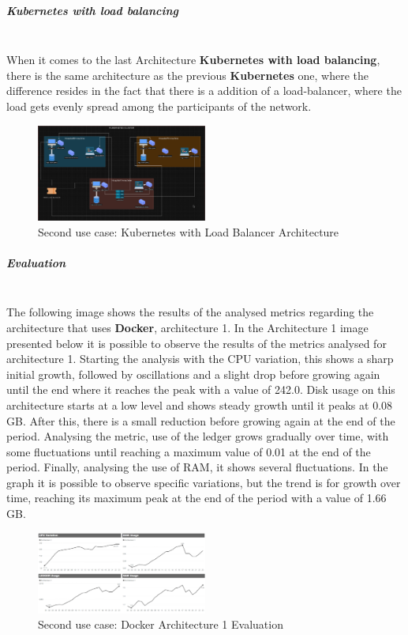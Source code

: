 \subparagraph{Kubernetes with load balancing} \mbox{}\\
When it comes to the last Architecture \textbf{Kubernetes with load balancing}, there is the same architecture as the previous \textbf{Kubernetes} one, where the difference resides in the fact that there is a addition of a load-balancer, where the load gets evenly spread among the participants of the network.
\begin{figure}[H]
	\centering
	\includegraphics[width=0.5\textwidth]{assets/use-case-2/k8-lb.png} %
	\caption{Second use case: Kubernetes with Load Balancer Architecture}
	\label{fig:sample-image} 
\end{figure}


\subparagraph{Evaluation} \mbox{}\\

The following image shows the results of the analysed metrics regarding the architecture that uses \textbf{Docker}, architecture 1.
In the Architecture 1 image presented below it is possible to observe the results of the metrics analysed for architecture 1. Starting the analysis with the CPU variation, this shows a sharp initial growth, followed by oscillations and a slight drop before growing again until the end where it reaches the peak with a value of 242.0.
Disk usage on this architecture starts at a low level and shows steady growth until it peaks at 0.08 GB. After this, there is a small reduction before growing again at the end of the period.
Analysing the metric, use of the ledger grows gradually over time, with some fluctuations until reaching a maximum value of 0.01 at the end of the period.
Finally, analysing the use of RAM, it shows several fluctuations. In the graph it is possible to observe specific variations, but the trend is for growth over time, reaching its maximum peak at the end of the period with a value of 1.66 GB.

\begin{figure}[H]
	\centering
	\includegraphics[width=0.5\textwidth]{assets/use-case-2/docker-evaluation.png} %
	\caption{Second use case: Docker Architecture 1 Evaluation}
	\label{fig:sample-image} 
\end{figure}

